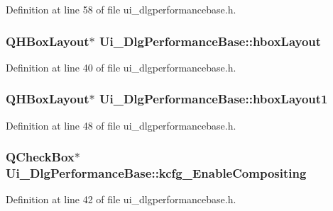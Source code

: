 Definition at line 58 of file ui\+\_\+dlgperformancebase.\+h.

\hypertarget{classUi__DlgPerformanceBase_af14f550725818437cba053b3da16ef8a}{
\subsubsection[{hbox\+Layout}]{\setlength{\rightskip}{0pt plus 5cm}Q\+H\+Box\+Layout$\ast$ Ui\+\_\+\+Dlg\+Performance\+Base\+::hbox\+Layout}}\label{classUi__DlgPerformanceBase_af14f550725818437cba053b3da16ef8a}


Definition at line 40 of file ui\+\_\+dlgperformancebase.\+h.

\hypertarget{classUi__DlgPerformanceBase_ade0a3a0e7bb84cff157c402871c86973}{
\subsubsection[{hbox\+Layout1}]{\setlength{\rightskip}{0pt plus 5cm}Q\+H\+Box\+Layout$\ast$ Ui\+\_\+\+Dlg\+Performance\+Base\+::hbox\+Layout1}}\label{classUi__DlgPerformanceBase_ade0a3a0e7bb84cff157c402871c86973}


Definition at line 48 of file ui\+\_\+dlgperformancebase.\+h.

\hypertarget{classUi__DlgPerformanceBase_a0a5b7fdc59983df4f9a1cae459eaa783}{
\subsubsection[{kcfg\+\_\+\+Enable\+Compositing}]{\setlength{\rightskip}{0pt plus 5cm}Q\+Check\+Box$\ast$ Ui\+\_\+\+Dlg\+Performance\+Base\+::kcfg\+\_\+\+Enable\+Compositing}}\label{classUi__DlgPerformanceBase_a0a5b7fdc59983df4f9a1cae459eaa783}


Definition at line 42 of file ui\+\_\+dlgperformancebase.\+h.

